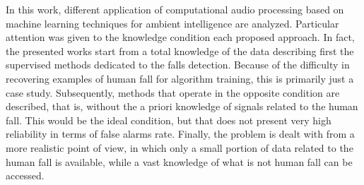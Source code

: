 In this work, different application of computational audio processing based on machine learning techniques for ambient intelligence are analyzed. Particular attention was given to the knowledge condition each proposed approach. In fact, the presented works start from a total knowledge of the data describing first the supervised methods dedicated to the falls detection. Because of the difficulty in recovering examples of human fall for algorithm training, this is primarily just a case study. Subsequently, methods that operate in the opposite condition are described, that is, without the a priori knowledge of signals related to the human fall. This would be the ideal condition, but that does not present very high reliability in terms of false alarms rate. Finally, the problem is dealt with from a more realistic point of view, in which only a small portion of data related to the human fall is available, while a vast knowledge of what is not human fall can be accessed.

